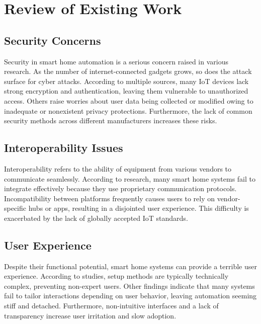 \documentclass[a4paper,12pt]{report}
\begin{document}
\section{Review of Existing Work}
\subsection{Security Concerns}
Security in smart home automation is a serious concern raised in various research.  As the number of internet-connected gadgets grows, so does the attack surface for cyber attacks.  According to multiple sources, many IoT devices lack strong encryption and authentication, leaving them vulnerable to unauthorized access\cite{Venkatesh}\cite{mazid2023iot}.  Others raise worries about user data being collected or modified owing to inadequate or nonexistent privacy protections\cite{li2023let}.  Furthermore, the lack of common security methods across different manufacturers increases these risks\cite{Sobin_2020}\cite{holguin2023smart}.

\subsection{Interoperability Issues}
Interoperability refers to the ability of equipment from various vendors to communicate seamlessly.  According to research, many smart home systems fail to integrate effectively because they use proprietary communication protocols\cite{portales2019challenges}\cite{Sobin_2020}.  Incompatibility between platforms frequently causes users to rely on vendor-specific hubs or apps, resulting in a disjointed user experience.  This difficulty is exacerbated by the lack of globally accepted IoT standards\cite{holguin2023smart}.

\subsection{User Experience}
Despite their functional potential, smart home systems can provide a terrible user experience.  According to studies, setup methods are typically technically complex, preventing non-expert users\cite{sita2024development}\cite{bai2024research}.  Other findings indicate that many systems fail to tailor interactions depending on user behavior, leaving automation seeming stiff and detached\cite{elmi2023interoperable}.  Furthermore, non-intuitive interfaces and a lack of transparency increase user irritation and slow adoption\cite{mare2019consumer}.
\end{document}
